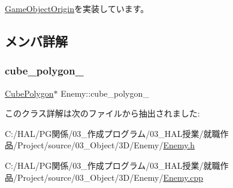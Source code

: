 \mbox{\hyperlink{class_game_object_origin_aeac8fc4a1f625982313a9a60dd35d016}{Game\+Object\+Origin}}を実装しています。



\subsection{メンバ詳解}
\mbox{\label{class_enemy_a9a24b765d76b789cc678701886570511}} 
\subsubsection{\texorpdfstring{cube\+\_\+polygon\+\_\+}{cube\_polygon\_}}
{\footnotesize\ttfamily \mbox{\hyperlink{class_cube_polygon}{Cube\+Polygon}}$\ast$ Enemy\+::cube\+\_\+polygon\+\_\+}



このクラス詳解は次のファイルから抽出されました\+:\begin{DoxyCompactItemize}
\item 
C\+:/\+H\+A\+L/\+P\+G関係/03\+\_\+作成プログラム/03\+\_\+\+H\+A\+L授業/就職作品/\+Project/source/03\+\_\+\+Object/3\+D/\+Enemy/\mbox{\hyperlink{_enemy_8h}{Enemy.\+h}}\item 
C\+:/\+H\+A\+L/\+P\+G関係/03\+\_\+作成プログラム/03\+\_\+\+H\+A\+L授業/就職作品/\+Project/source/03\+\_\+\+Object/3\+D/\+Enemy/\mbox{\hyperlink{_enemy_8cpp}{Enemy.\+cpp}}\end{DoxyCompactItemize}
